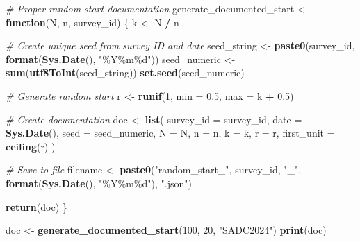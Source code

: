 \documentclass[
]{article}
\newenvironment{Shaded}{\begin{snugshade}}{\end{snugshade}}
\newcommand{\AttributeTok}[1]{\textcolor[rgb]{0.13,0.29,0.53}{#1}}
\newcommand{\CommentTok}[1]{\textcolor[rgb]{0.56,0.35,0.01}{\textit{#1}}}
\newcommand{\ControlFlowTok}[1]{\textcolor[rgb]{0.13,0.29,0.53}{\textbf{#1}}}
\newcommand{\DecValTok}[1]{\textcolor[rgb]{0.00,0.00,0.81}{#1}}
\newcommand{\FloatTok}[1]{\textcolor[rgb]{0.00,0.00,0.81}{#1}}
\newcommand{\FunctionTok}[1]{\textcolor[rgb]{0.13,0.29,0.53}{\textbf{#1}}}
\newcommand{\NormalTok}[1]{#1}
\newcommand{\OtherTok}[1]{\textcolor[rgb]{0.56,0.35,0.01}{#1}}
\newcommand{\SpecialCharTok}[1]{\textcolor[rgb]{0.81,0.36,0.00}{\textbf{#1}}}
\newcommand{\StringTok}[1]{\textcolor[rgb]{0.31,0.60,0.02}{#1}}
\begin{document}
\begin{Shaded}
\begin{Highlighting}[]
\CommentTok{\# Proper random start documentation}
\NormalTok{generate\_documented\_start }\OtherTok{\textless{}{-}} \ControlFlowTok{function}\NormalTok{(N, n, survey\_id) \{}
\NormalTok{  k }\OtherTok{\textless{}{-}}\NormalTok{ N }\SpecialCharTok{/}\NormalTok{ n}
  
  \CommentTok{\# Create unique seed from survey ID and date}
\NormalTok{  seed\_string }\OtherTok{\textless{}{-}} \FunctionTok{paste0}\NormalTok{(survey\_id, }\FunctionTok{format}\NormalTok{(}\FunctionTok{Sys.Date}\NormalTok{(), }\StringTok{"\%Y\%m\%d"}\NormalTok{))}
\NormalTok{  seed\_numeric }\OtherTok{\textless{}{-}} \FunctionTok{sum}\NormalTok{(}\FunctionTok{utf8ToInt}\NormalTok{(seed\_string))}
  \FunctionTok{set.seed}\NormalTok{(seed\_numeric)}
  
  \CommentTok{\# Generate random start}
\NormalTok{  r }\OtherTok{\textless{}{-}} \FunctionTok{runif}\NormalTok{(}\DecValTok{1}\NormalTok{, }\AttributeTok{min =} \FloatTok{0.5}\NormalTok{, }\AttributeTok{max =}\NormalTok{ k }\SpecialCharTok{+} \FloatTok{0.5}\NormalTok{)}
  
  \CommentTok{\# Create documentation}
\NormalTok{  doc }\OtherTok{\textless{}{-}} \FunctionTok{list}\NormalTok{(}
    \AttributeTok{survey\_id =}\NormalTok{ survey\_id,}
    \AttributeTok{date =} \FunctionTok{Sys.Date}\NormalTok{(),}
    \AttributeTok{seed =}\NormalTok{ seed\_numeric,}
    \AttributeTok{N =}\NormalTok{ N,}
    \AttributeTok{n =}\NormalTok{ n,}
    \AttributeTok{k =}\NormalTok{ k,}
    \AttributeTok{r =}\NormalTok{ r,}
    \AttributeTok{first\_unit =} \FunctionTok{ceiling}\NormalTok{(r)}
\NormalTok{  )}
  
  \CommentTok{\# Save to file}
\NormalTok{  filename }\OtherTok{\textless{}{-}} \FunctionTok{paste0}\NormalTok{(}\StringTok{"random\_start\_"}\NormalTok{, survey\_id, }\StringTok{"\_"}\NormalTok{, }
                     \FunctionTok{format}\NormalTok{(}\FunctionTok{Sys.Date}\NormalTok{(), }\StringTok{"\%Y\%m\%d"}\NormalTok{), }\StringTok{".json"}\NormalTok{)}
  
  \FunctionTok{return}\NormalTok{(doc)}
\NormalTok{\}}

\NormalTok{doc }\OtherTok{\textless{}{-}} \FunctionTok{generate\_documented\_start}\NormalTok{(}\DecValTok{100}\NormalTok{, }\DecValTok{20}\NormalTok{, }\StringTok{"SADC2024"}\NormalTok{)}
\FunctionTok{print}\NormalTok{(doc)}
\end{Highlighting}
\end{Shaded}
\end{document}
